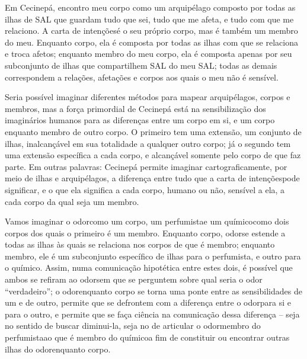 Em Cecinepá, encontro meu corpo como um arquipélago composto por todas as ilhas de SAL que guardam tudo que sei, tudo que me afeta, e tudo com que me relaciono. A \guillemetleft carta de intenções\guillemetright é o seu próprio corpo, mas é também um membro do meu. Enquanto corpo, ela é composta por todas as ilhas com que se relaciona e troca afetos; enquanto membro do meu corpo, ela é composta apenas por seu subconjunto de ilhas que compartilhem SAL do meu SAL; todas as demais correspondem a relações, afetações e corpos aos quais o meu não é sensível.

Seria possível imaginar diferentes métodos para mapear arquipélagos, corpos e membros, mas a força primordial de Cecinepá está na sensibilização dos imaginários humanos para as diferenças entre um corpo em si, e um corpo enquanto membro de outro corpo. O primeiro tem uma extensão, um conjunto de ilhas, inalcançável em sua totalidade a qualquer outro corpo; já o segundo tem uma extensão específica a cada corpo, e alcançável somente pelo corpo de que faz parte. Em outras palavras: Cecinepá permite imaginar cartograficamente, por meio de ilhas e arquipélagos, a diferença entre tudo que a \guillemetleft carta de intenções\guillemetright pode significar, e o que ela significa a cada corpo, humano ou não, sensível a ela, a cada corpo da qual seja um membro.

Vamos imaginar o \guillemetleft odor\guillemetright como um corpo, um \guillemetleft perfumista\guillemetright e um \guillemetleft químico\guillemetright como dois corpos dos quais o primeiro é um membro. Enquanto corpo, \guillemetleft odor\guillemetright se estende a todas as ilhas às quais se relaciona nos corpos de que é membro; enquanto membro, ele é um subconjunto específico de ilhas para o \guillemetleft perfumista\guillemetright, e outro para o \guillemetleft químico\guillemetright. Assim, numa comunicação hipotética entre estes dois, é possível que ambos se refiram ao \guillemetleft odor\guillemetright sem que se perguntem sobre qual seria o odor \enquote{verdadeiro}; o \guillemetleft odor\guillemetright enquanto corpo se torna uma ponte entre as sensibilidades de um e de outro, permite que se defrontem com a diferença entre o \guillemetleft odor\guillemetright para si e para o outro, e permite que se faça ciência na comunicação dessa diferença -- seja no sentido de buscar diminui-la, seja no de articular o \guillemetleft odor\guillemetright membro do \guillemetleft perfumista\guillemetright ao que é membro do \guillemetleft químico\guillemetright a fim de constituir ou encontrar outras ilhas do \guillemetleft odor\guillemetright enquanto corpo.

